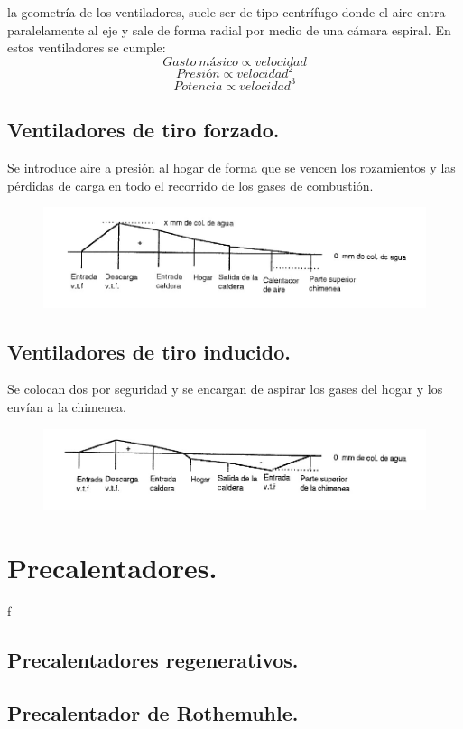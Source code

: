 la geometría de los ventiladores, suele ser de tipo centrífugo donde el aire entra paralelamente al eje y sale de forma radial por medio de una cámara espiral. En estos ventiladores se cumple:
\[Gasto \ másico \propto velocidad\]
\[Presión\propto velocidad^2\]
\[Potencia\propto velocidad^3\]


\subsection{Ventiladores de tiro forzado.}
Se introduce aire a presión al hogar de forma que se vencen los rozamientos y las pérdidas de carga en todo el recorrido de los gases de combustión.
\begin{figure}[H]
	\centering
	\includegraphics[width=0.7\linewidth]{res/tema10/forzao}
	\label{fig:forzao}
\end{figure}

\subsection{Ventiladores de tiro inducido.}
Se colocan dos por seguridad y se encargan de aspirar los gases del hogar y los envían a la chimenea.
\begin{figure}[H]
	\centering
	\includegraphics[width=0.7\linewidth]{res/tema10/inducio}
	\label{fig:inducio}
\end{figure}

\section{Precalentadores.}
f
\subsection{Precalentadores regenerativos.}
\subsection{Precalentador de Rothemuhle.}



